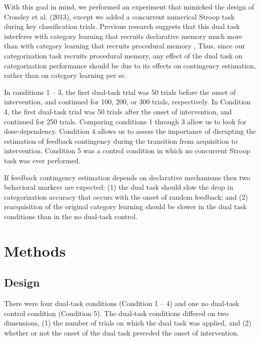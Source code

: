 \documentclass[man,apacite,draftfirst]{apa6}
\begin{document}
With this goal in mind, we performed an experiment that mimicked the design of
Crossley et al. (2013), except we added a concurrent numerical Stroop task
during key classification trials. Previous research suggests that this dual task
interferes with category learning that recruits declarative memory much more
than with category learning that recruits procedural memory
\cite{WaldronAshby2001, crossley2016declarative}, Thus, since our categorization
task recruits procedural memory, any effect of the dual task on categorization
performance should be due to its effects on contingency estimation, rather than
on category learning per se.


In conditions 1 -- 3, the first dual-task trial was 50 trials before the onset
of intervention, and continued for 100, 200, or 300 trials, respectively. In
Condition 4, the first dual-task trial was 50 trials after the onset of
intervention, and continued for 250 trials. Comparing conditions 1 through 3
allow us to look for dose-dependency. Condition 4 allows us to assess the
importance of disrupting the estimation of feedback contingency during the
transition from acquisition to intervention. Condition 5 was a control condition
in which no concurrent Stroop task was ever performed.

If feedback contingency estimation depends on declarative mechanisms then two
behavioral markers are expected: (1) the dual task should slow the drop in
categorization accuracy that occurs with the onset of random feedback; and (2)
reacquisition of the original category learning should be slower in the dual
task conditions than in the no dual-task control.

\section*{Methods}
\subsection*{Design} There were four dual-task conditions (Condition 1 -- 4) and
one no dual-task control condition (Condition 5). The dual-task conditions
differed on two dimensions, (1) the number of trials on which the dual task was
applied, and (2) whether or not the onset of the dual task preceded the onset of
intervention.
\end{document}
